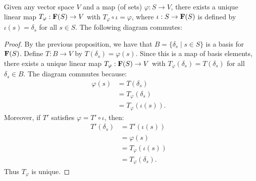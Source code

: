     \begin{theorem}
        Given any vector space $V$ and a map (of sets) $\varphi:S \rightarrow V$, there exists a unique linear map $T_\varphi : \mathbf{F}(S) \rightarrow V$ with $T_\varphi \circ \iota = \varphi$, where $\iota:S \rightarrow \mathbf{F}(S)$ is defined by $\iota(s) = \delta_s$ for all $s \in S$. The following diagram commutes:
            \begin{center}
            \end{center}
    \end{theorem}
        \begin{proof}
            By the previous proposition, we have that $B = \{\delta_s \mid s \in S\}$ is a basis for $\mathbf{F}(S)$. Define $T:B \rightarrow V$ by $T(\delta_s) = \varphi(s)$. Since this is a map of basis elements, there exists a unique linear map $T_\varphi:\mathbf{F}(S) \rightarrow V$ with $T_\varphi(\delta_s) = T(\delta_s)$ for all $\delta_s \in B$. The diagram commutes because:
                \begin{equation*}
                \begin{split}
                    \varphi(s)
                    & = T(\delta_s) \\
                    & = T_\varphi(\delta_s) \\
                    & = T_\varphi(\iota(s)).
                \end{split}
                \end{equation*}
            Moreover, if $T'$ satisfies $\varphi = T' \circ \iota$, then:
                \begin{equation*}
                \begin{split}
                    T'(\delta_s)
                    & = T'(\iota(s)) \\
                    & = \varphi(s) \\
                    & = T_\varphi(\iota(s)) \\
                    & = T_\varphi(\delta_s).
                \end{split}
                \end{equation*}
            Thus $T_\varphi$ is unique.
        \end{proof}

